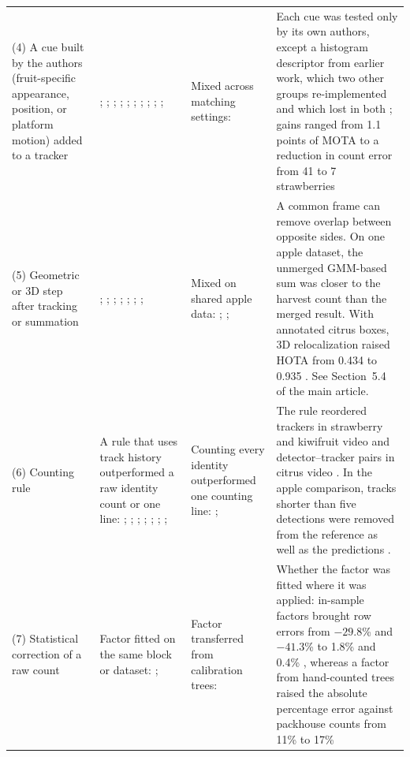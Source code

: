 \documentclass[a4paper,11pt]{article}
\begin{document}
\begin{footnotesize}
\begin{longtable}{@{}L{2.8cm}L{3.6cm}L{3.5cm}L{5.0cm}@{}}
\addlinespace
(4) A cue built by the authors (fruit-specific appearance, position, or platform motion) added to a tracker & \citet{kirk2021robust}; \citet{yang2024automatic}; \citet{dong2025fruit}; \citet{meng2024real}; \citet{hu2023fruit}; \citet{du2024green}; \citet{ahmedtaristizabal2024field}; \citet{zheng2023object}; \citet{lei2025spatio}; \citet{dai2022tracking}; \citet{piazolo2026enhanced} & Mixed across matching settings: \citet{fusaro2026horticultural} & Each cue was tested only by its own authors, except a histogram descriptor from earlier work, which two other groups re-implemented and which lost in both \citep{fusaro2026horticultural,lei2025spatio}; gains ranged from 1.1 points of MOTA \citep{dong2025fruit} to a reduction in count error from 41 to 7 strawberries \citep{kirk2021robust}\\
\addlinespace
(5) Geometric or 3D step after tracking or summation & \citet{liu2018robust}; \citet{gongal2016apple}; \citet{wei2025multi}; \citet{santos2024multiple}; \citet{matos2024tracking}; \citet{ciarfuglia2023weakly}; \citet{zhou2024utilizing}; \citet{yoshida2026cross} & Mixed on shared apple data: \citet{hani2020comparative}; \citet{roy2019vision}; \citet{dong2020semantic} & A common frame can remove overlap between opposite sides. On one apple dataset, the unmerged GMM-based sum was closer to the harvest count than the merged result. With annotated citrus boxes, 3D relocalization raised HOTA from 0.434 to 0.935 \citep{santos2024multiple}. See Section~5.4 of the main article.\\
\addlinespace
(6) Counting rule & A rule that uses track history outperformed a raw identity count or one line: \citet{zhou2024advancing}; \citet{zhang2025row}; \citet{zheng2023efficient}; \citet{rong2023tomato}; \citet{tenorio2021automatic}; \citet{an2024stratracker}; \citet{feng2026greenhouse}; \citet{lu2025iot} & Counting every identity outperformed one counting line: \citet{parico2021real}; \citet{sasse2025object} & The rule reordered trackers in strawberry and kiwifruit video and detector--tracker pairs in citrus video \citep{zhou2024advancing,zhang2025row,zheng2023efficient}. In the apple comparison, tracks shorter than five detections were removed from the reference as well as the predictions \citep{matos2024tracking}.\\
\addlinespace
(7) Statistical correction of a raw count & Factor fitted on the same block or dataset: \citet{wang2013automated}; \citet{indriani2026sawitmvc} & Factor transferred from calibration trees: \citet{anderson2021estimation} & Whether the factor was fitted where it was applied: in-sample factors brought row errors from $-29.8$\% and $-41.3$\% to 1.8\% and 0.4\% \citep{wang2013automated}, whereas a factor from hand-counted trees raised the absolute percentage error against packhouse counts from 11\% to 17\% \citep{anderson2021estimation}\\

\end{longtable}
\end{footnotesize}
\end{document}
